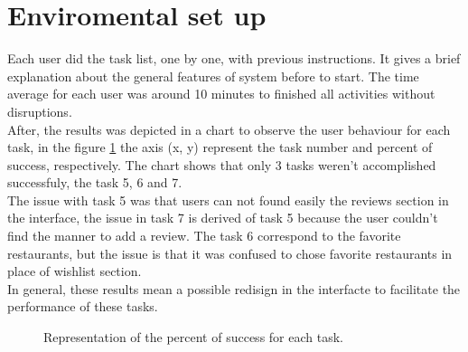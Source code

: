 \section{Enviromental set up}

Each user did the task list, one by one, with previous instructions. It gives a brief explanation about the general features of system before to start. The time average for each user was around 10 minutes to finished all activities without disruptions.\\ 
After, the results was depicted in a chart to observe the user behaviour for each task, in the figure \ref{fig:tsuccess}  the axis (x, y) represent the task number and percent of success, respectively. The chart shows that only 3 tasks weren’t accomplished successfuly, the task 5, 6 and 7. \\ The issue with task 5 was that users can not found easily the reviews section in the interface, the issue in task 7 is derived of task 5 because the user couldn’t find the manner to add a review. The task 6 correspond to the favorite restaurants, but the issue is that it was confused to chose favorite restaurants in place of wishlist section. \\ In general, these results mean a possible redisign in the interfacte to facilitate the performance of these tasks.
\begin{figure}
\centering
\captionsetup{font=footnotesize}
\caption{Representation of the percent of success for each task.}
\label{fig:tsuccess}   
\end{figure}
